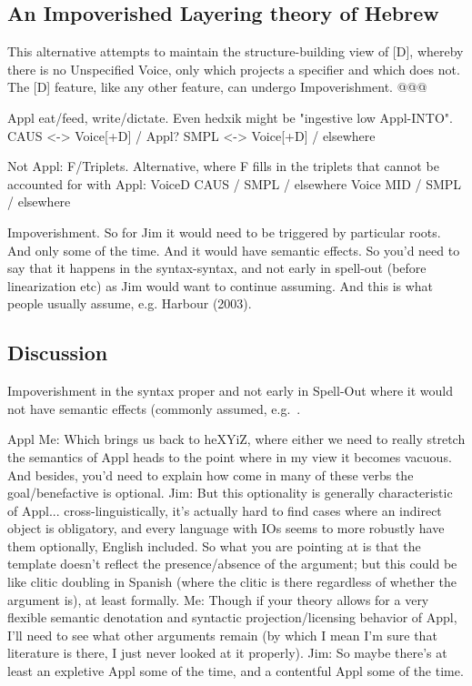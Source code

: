	\subsection{An Impoverished Layering theory of Hebrew} \label{aas:jim:pros}
This alternative attempts to maintain the structure-building view of [D], whereby there is no Unspecified Voice, only {\vds} which projects a specifier and {\vzs} which does not. The [D] feature, like any other feature, can undergo Impoverishment.
@@@

Appl
eat/feed, write/dictate. Even hedxik might be "ingestive low Appl-INTO".
CAUS <-> Voice[+D] / \trace Appl?
SMPL <-> Voice[+D] / elsewhere

Not Appl: F/Triplets.
Alternative, where F fills in the triplets that cannot be accounted for with Appl:
Voice{D} \lra CAUS / 
				\lra SMPL / elsewhere
Voice{} \lra MID / 
				\lra SMPL / elsewhere


Impoverishment.
	So for Jim it would need to be triggered by particular roots.
	And only some of the time.
	And it would have semantic effects.
	So you'd need to say that it happens in the syntax-syntax, and not early in spell-out (before linearization etc) as Jim would want to continue assuming. And this is what people usually assume, e.g. Harbour (2003).
	
	
	\subsection{Discussion} \label{aas:jim:cons}
Impoverishment in the syntax proper and not early in Spell-Out where it would not have semantic effects (commonly assumed, e.g.~\citealt{harbour03}.


Appl
Me: Which brings us back to heXYiZ, where either we need to really stretch the semantics of Appl heads to the point where in my view it becomes vacuous. And besides, you'd need to explain how come in many of these verbs the goal/benefactive is optional.
	Jim: But this optionality is generally characteristic of Appl... cross-linguistically, it's actually hard to find cases where an indirect object is obligatory, and every language with IOs seems to more robustly have them optionally, English included. So what you are pointing at is that the template doesn't reflect the presence/absence of the argument; but this could be like clitic doubling in Spanish (where the clitic is there regardless of whether the argument is), at least formally. 
	Me: Though if your theory allows for a very flexible semantic denotation and syntactic projection/licensing behavior of Appl, I'll need to see what other arguments remain (by which I mean I'm sure that literature is there, I just never looked at it properly).
Jim: So maybe there's at least an expletive Appl some of the time, and a contentful Appl some of the time.


